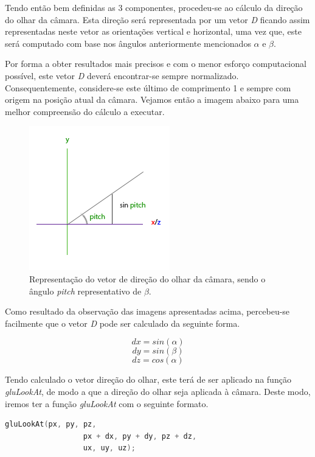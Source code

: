 \documentclass[a4paper]{article}
\begin{document}
Tendo então bem definidas as 3 componentes, procedeu-se ao cálculo da direção do olhar da câmara. Esta direção será representada por um vetor \textit{D} ficando assim representadas neste vetor as orientações vertical e horizontal, uma vez que, este será computado com base nos ângulos anteriormente mencionados $\alpha$ e $\beta$.

Por forma a obter resultados mais precisos e com o menor esforço computacional possível, este vetor \textit{D} deverá encontrar-se sempre normalizado. Consequentemente, considere-se este último de comprimento 1 e sempre com origem na posição atual da câmara. Vejamos então a imagem abaixo para uma melhor compreensão do cálculo a executar.

\begin{figure}[!h]
    \centering
    \includegraphics[width=0.5\linewidth]{camera_pitch.png}
    \caption{Representação do vetor de direção do olhar da câmara, sendo o ângulo \textit{pitch} representativo de $\beta$.}
    \label{fig:ref_FPS1}
\end{figure}

Como resultado da observação das imagens apresentadas acima, percebeu-se facilmente que o vetor \textit{D} pode ser calculado da seguinte forma.

\[ dx = sin(\alpha) \]
\[ dy = sin(\beta) \]
\[ dz = cos(\alpha) \]

Tendo calculado o vetor direção do olhar, este terá de ser aplicado na função \textit{gluLookAt}, de modo a que a direção do olhar seja aplicada à câmara. Deste modo, iremos ter a função \textit{gluLookAt} com o seguinte formato.

\begin{lstlisting}[language=C++, caption=Definição da função \textit{gluLookAt}.]
        gluLookAt(px, py, pz,
                  px + dx, py + dy, pz + dz,
                  ux, uy, uz);
\end{lstlisting}
\end{document}
